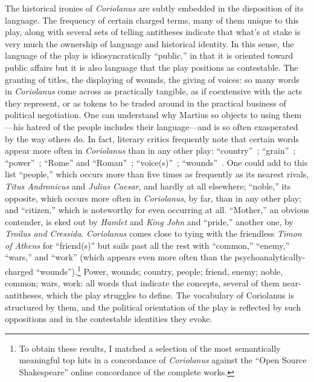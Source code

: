The historical ironies of \emph{Coriolanus} are subtly embedded in the disposition of its language.
The frequency of certain charged terms, many of them unique to this play, along with several sets of telling antitheses indicate that what's at stake is very much the ownership of language and historical identity.
In this sense, the language of the play is idiosyncratically ``public,'' in that it is oriented toward public affairs but it is also language that the play positions as contestable.
The granting of titles, the displaying of wounds, the giving of voices: so many words in \emph{Coriolanus} come across as practically tangible, as if coextensive with the acts they represent, or as tokens to be traded around in the practical business of political negotiation.
One can understand why Martius so objects to using them---his hatred of the people includes their language---and is so often exasperated by the way others do.
In fact, literary critics frequently note that certain words appear more often in \emph{Coriolanus} than in any other play: ``country''~\cite[150]{knowles_shakespeares_2002}; ``grain''~\cite[201]{westerweel_plutarchs_2001}; ``power''~\cite[141]{patterson_shakespeare_1989}; ``Rome'' and ``Roman''~\cite[165]{chernaik_myth_2011}; ``voice(s)''~\cite[250]{kermode_shakespeares_2000}; ``wounds''~\cite[47]{holland_coriolanus_2011}.
One could add to this list ``people,'' which occurs more than five times as frequently as its nearest rivals, \emph{Titus Andronicus} and \emph{Julius Caesar}, and hardly at all elsewhere; ``noble,'' its opposite, which occurs more often in \emph{Coriolanus}, by far, than in any other play; and ``citizen,'' which is noteworthy for even occurring at all.
``Mother,'' an obvious contender, is eked out by \emph{Hamlet} and \emph{King John} and ``pride,'' another one, by \emph{Troilus and Cressida}.
\emph{Coriolanus} comes close to tying with the friendless \emph{Timon of Athens} for ``friend(s)'' but sails past all the rest with ``common,'' ``enemy,'' ``wars,'' and ``work'' (which appears even more often than the psychoanalytically-charged ``wounds'').\footnote{To obtain these results, I matched a selection of the most semantically meaningful top hits in a concordance of \emph{Coriolanus} against the ``Open Source Shakespeare'' online concordance of the complete works.}
Power, wounds; country, people; friend, enemy; noble, common; wars, work: all words that indicate the concepts, several of them near-antitheses, which the play struggles to define.
The vocabulary of Coriolanus is structured by them, and the political orientation of the play is reflected by such oppositions and in the contestable identities they evoke.

